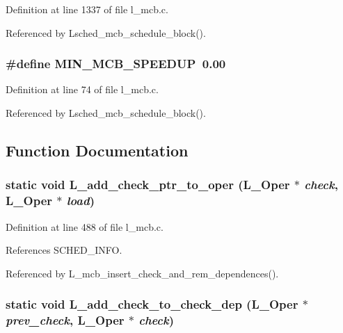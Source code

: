 Definition at line 1337 of file l\_\-mcb.c.

Referenced by Lsched\_\-mcb\_\-schedule\_\-block().
\subsubsection{\setlength{\rightskip}{0pt plus 5cm}\#define MIN\_\-MCB\_\-SPEEDUP~0.00}\label{l__mcb_8c_2afef09fe0afc9994a8e4736a9413a56}




Definition at line 74 of file l\_\-mcb.c.

Referenced by Lsched\_\-mcb\_\-schedule\_\-block().

\subsection{Function Documentation}
\subsubsection{\setlength{\rightskip}{0pt plus 5cm}static void L\_\-add\_\-check\_\-ptr\_\-to\_\-oper (L\_\-Oper $\ast$ {\em check}, L\_\-Oper $\ast$ {\em load})\hspace{0.3cm}{\tt  [static]}}\label{l__mcb_8c_45fa3b90dfc4e7f439ac3da0d95588d1}




Definition at line 488 of file l\_\-mcb.c.

References SCHED\_\-INFO.

Referenced by L\_\-mcb\_\-insert\_\-check\_\-and\_\-rem\_\-dependences().
\subsubsection{\setlength{\rightskip}{0pt plus 5cm}static void L\_\-add\_\-check\_\-to\_\-check\_\-dep (L\_\-Oper $\ast$ {\em prev\_\-check}, L\_\-Oper $\ast$ {\em check})\hspace{0.3cm}{\tt  [static]}}\label{l__mcb_8c_0737f2797f1808792164e73445bcd227}




